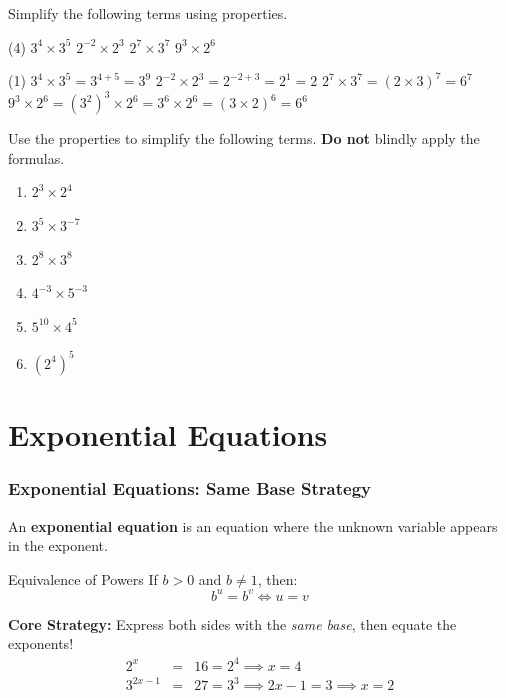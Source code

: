 \begin{frame}[t]
  \begin{ex}
    Simplify the following terms using properties.
    \begin{tasks}(4)
      \task $3^4 \times 3^5$
      \task $2^{-2} \times 2^{3}$
      \task $2^7 \times 3^7$
      \task $9^3 \times 2^6$
    \end{tasks}
  \end{ex}
  \begin{sol}
    \begin{tasks}(1)
      \task $3^4 \times 3^5 = 3^{4+5} = 3^9$
      \task $2^{-2} \times 2^{3} = 2^{-2+3} = 2^1 = 2$
      \task $2^7 \times 3^7 = (2 \times 3)^7 = 6^7$
      \task $9^3 \times 2^6 = (3^2)^3 \times 2^6 = 3^6 \times 2^6 = (3 \times 2)^6 = 6^6$
    \end{tasks}
  \end{sol}
\end{frame}

\begin{frame}
  \begin{exercisebox}{}{}
    Use the properties to simplify the following terms. \textbf{Do not} blindly apply the formulas.
    \begin{enumerate}
      \item $2^3 \times 2^4$
      \item $3^5 \times 3^{-7}$
      \item $2^8 \times 3^8$
      \item $4^{-3} \times 5^{-3}$
      \item $5^{10} \times 4^{5}$
      \item $(2^4)^5$
    \end{enumerate}
  \end{exercisebox}
\end{frame}

\section[Equations]{Exponential Equations}
\frame{\sectionpage}

\begin{frame}[t]
  \frametitle{Exponential Equations: Same Base Strategy}
  An \textbf{exponential equation} is an equation where the unknown variable appears in the exponent.
  \begin{thm}{Equivalence of Powers}{}
    If $b > 0$ and $b \neq 1$, then:
    \[ b^u = b^v \iff u = v \]
  \end{thm}
  \begin{slide}
    \textbf{Core Strategy:} Express both sides with the \emph{same base}, then equate the exponents!
    \begin{eqnarray*}
      2^x &=& 16 = 2^4 \implies x = 4 \\
      3^{2x-1} &=& 27 = 3^3 \implies 2x-1 = 3 \implies x = 2
    \end{eqnarray*}
  \end{slide}
\end{frame}

